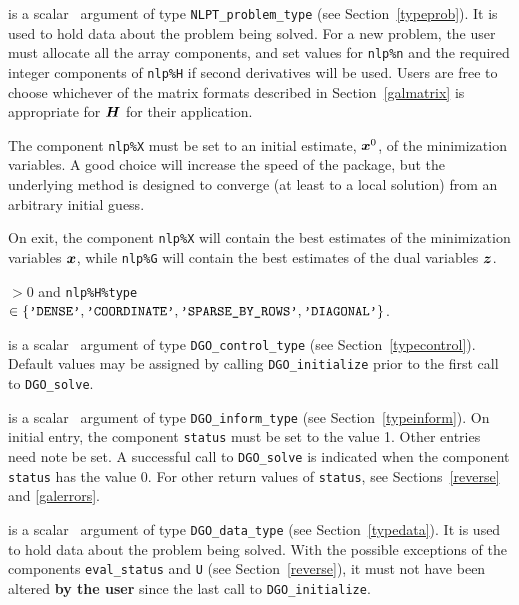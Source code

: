 \documentclass{galahad}
\newcommand{\packagename}{DGO}
\begin{document}
\vspace*{-2mm}
\begin{description}
 is a scalar \intentinout\ argument of type
{\tt NLPT\_problem\_type}
(see Section~\ref{typeprob}).
It is used to hold data about the problem being solved.
For a new problem, the user must allocate all the array components,
and set values for {\tt nlp\%n}
and the required integer components of {\tt nlp\%H} if second derivatives
will be used.
Users are free to choose whichever
of the matrix formats described in Section~\ref{galmatrix}
is appropriate for ${\bm{H}}$ for their application.

\noindent
The component {\tt nlp\%X} must be set to an initial estimate, ${\bm{x}}^{0}$,
of the minimization variables. A good choice will increase the speed
of the package, but the underlying method is designed to converge (at least
to a local solution) from an arbitrary initial guess.

\noindent
On exit, the component {\tt nlp\%X} will contain the best estimates of the
minimization variables ${\bm{x}}$, while {\tt nlp\%G} will contain the best 
estimates of the dual variables ${\bm{z}}$.

\noindent
{} $> 0$ and
{\tt nlp\%H\%type} $\in \{
  \mbox{\tt 'DENSE'}, \mbox{\tt 'COORDINATE'}, \mbox{\tt 'SPARSE\_BY\_ROWS'},
  \mbox{\tt 'DIAGONAL'} \}$.

 is a scalar \intentin\ argument of type
{\tt \packagename\_control\_type}
(see Section~\ref{typecontrol}). Default values may be assigned by calling
{\tt \packagename\_initialize} prior to the first call to
{\tt \packagename\_solve}. 

 is a scalar \intentinout\ argument of type
{\tt \packagename\_inform\_type}
(see Section~\ref{typeinform}).
On initial entry, the  component {\tt status} must be set to the value 1.
Other entries need note be set.
A successful call to
{\tt \packagename\_solve}
is indicated when the  component {\tt status} has the value 0.
For other return values of {\tt status}, see Sections~\ref{reverse} and
\ref{galerrors}.

 is a scalar \intentinout\ argument of type
{\tt \packagename\_data\_type}
(see Section~\ref{typedata}). It is used to hold data about the problem being
solved. With the possible exceptions of the components
{\tt eval\_status} and {\tt U} (see Section~\ref{reverse}),
it must not have been altered {\bf by the user} since the last call to
{\tt \packagename\_initialize}.


\end{description}
\end{document}
